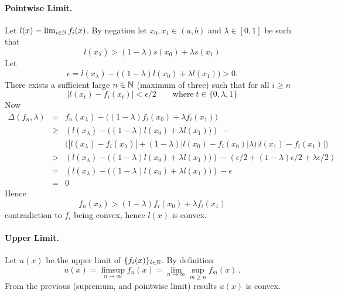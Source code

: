 \begin{enumerate}
\paragraph{Pointwise Limit.}
Let \(l(x) = \lim_{i\in \mathbb{N}}f_i(x)\).
By negation let \(x_0,x_1\in(a,b)\) and \(\lambda\in[0,1]\) be such that
\begin{equation*}
l(x_\lambda) >  (1-\lambda)s(x_0) + \lambda s(x_1)
\end{equation*}
Let
\begin{equation*}
 \epsilon =
   l(x_\lambda) -
   \bigl((1-\lambda)l(x_0) + \lambda l(x_1)\bigr) > 0.
\end{equation*}
There exists a sufficient large \(n\in\mathbb{N}\) (maximum of three)
such that for all \(i\geq n\)
\begin{equation*}
 \bigl|l(x_t) - f_i(x_t)\bigr| < \epsilon/2 \qquad
 \textrm{where}\; t\in\{0,\lambda,1\}
\end{equation*}
Now
\begin{eqnarray*}
\Delta(f_n,\lambda)
&=& f_n(x_\lambda) - \bigl((1-\lambda)f_i(x_0) + \lambda f_i(x_1)\bigr) \\
&\geq&
\left(l(x_\lambda) - \bigl((1-\lambda)l(x_0) + \lambda l(x_1)\bigr)\right)
 \; - \\
&&
  \bigl(
     |l(x_\lambda) - f_i(x_\lambda)| +
     (1-\lambda)|l(x_0) - f_i(x_0)|
     \lambda)|l(x_1) - f_i(x_1)|\bigr)\\
&>&
\left(l(x_\lambda) - \bigl((1-\lambda)l(x_0) + \lambda l(x_1)\bigr)\right)
 - (\epsilon/2 + (1-\lambda)\epsilon/2 + \lambda\epsilon/2) \\
&=&
\left(l(x_\lambda) - \bigl((1-\lambda)l(x_0) + \lambda l(x_1)\bigr)\right)
 - \epsilon \\
&=& 0
\end{eqnarray*}
Hence
\begin{equation*}
f_n(x_\lambda) > (1-\lambda)f_i(x_0) + \lambda f_i(x_1)
\end{equation*}
contradiction to \(f_i\) being convex, hence \(l(x)\) is convex.


\paragraph{Upper Limit.} Let \(u(x)\) be the upper limit of
\(\{f_i(x) \}_{i\in \mathbb{N}}\). By definition
\begin{equation*}
u(x) = \limsup_{n\to \infty} f_n(x)
     = \lim_{n\to \infty} \sup_{m\geq n} f_m(x)\,.
\end{equation*}
From the previous (supremum, and pointwise limit) results \(u(x)\) is convex.



\end{enumerate}
